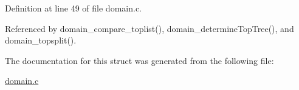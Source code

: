 \-Definition at line 49 of file domain.\-c.



\-Referenced by domain\-\_\-compare\-\_\-toplist(), domain\-\_\-determine\-Top\-Tree(), and domain\-\_\-topsplit().



\-The documentation for this struct was generated from the following file\-:\begin{DoxyCompactItemize}
\item 
\hyperlink{domain_8c}{domain.\-c}\end{DoxyCompactItemize}
